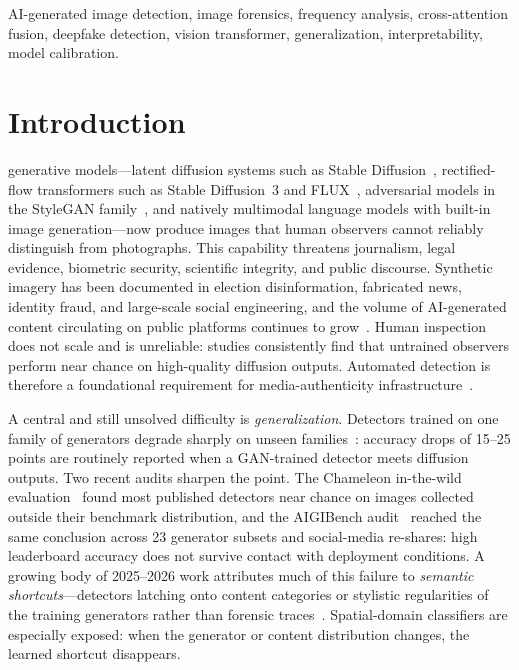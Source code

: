 \documentclass[journal]{IEEEtran}
\begin{document}
\begin{IEEEkeywords}
AI-generated image detection, image forensics, frequency analysis, cross-attention fusion, deepfake detection, vision transformer, generalization, interpretability, model calibration.
\end{IEEEkeywords}

\IEEEpeerreviewmaketitle

\section{Introduction}
 generative models---latent diffusion systems such as Stable Diffusion~\cite{rombach2022}, rectified-flow transformers such as Stable Diffusion~3 and FLUX~\cite{esser2024}, adversarial models in the StyleGAN family~\cite{karras2019}, and natively multimodal language models with built-in image generation---now produce images that human observers cannot reliably distinguish from photographs. This capability threatens journalism, legal evidence, biometric security, scientific integrity, and public discourse. Synthetic imagery has been documented in election disinformation, fabricated news, identity fraud, and large-scale social engineering, and the volume of AI-generated content circulating on public platforms continues to grow~\cite{croitoru2024,pei2026survey}. Human inspection does not scale and is unreliable: studies consistently find that untrained observers perform near chance on high-quality diffusion outputs. Automated detection is therefore a foundational requirement for media-authenticity infrastructure~\cite{wang2020,ojha2023,zhu2023genimage,tan2024npr}.

A central and still unsolved difficulty is \emph{generalization}. Detectors trained on one family of generators degrade sharply on unseen families~\cite{ojha2023,corvi2023,yan2025sanity}: accuracy drops of 15--25 points are routinely reported when a GAN-trained detector meets diffusion outputs. Two recent audits sharpen the point. The Chameleon in-the-wild evaluation~\cite{yan2025sanity} found most published detectors near chance on images collected outside their benchmark distribution, and the AIGIBench audit~\cite{li2025aigibench} reached the same conclusion across 23 generator subsets and social-media re-shares: high leaderboard accuracy does not survive contact with deployment conditions. A growing body of 2025--2026 work attributes much of this failure to \emph{semantic shortcuts}---detectors latching onto content categories or stylistic regularities of the training generators rather than forensic traces~\cite{shuai2026shortcuts}. Spatial-domain classifiers are especially exposed: when the generator or content distribution changes, the learned shortcut disappears.
\end{document}
